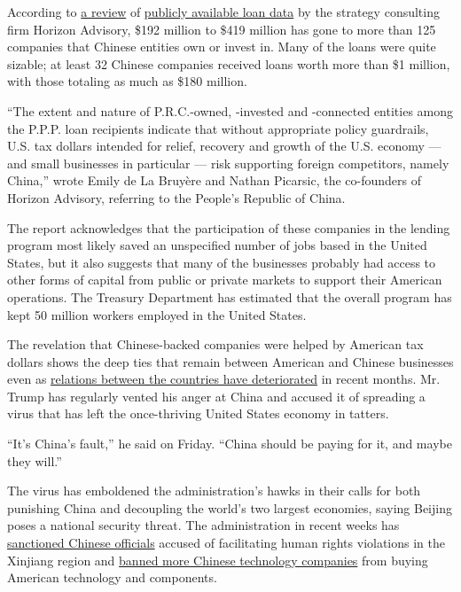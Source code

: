 According to \href{https://www.horizonadvisory.org/paycheckprotection}{a
review} of
\href{https://www.nytimes.com/2020/07/06/us/ppp-small-business-loans.html}{publicly
available loan data} by the strategy consulting firm Horizon Advisory,
\$192 million to \$419 million has gone to more than 125 companies that
Chinese entities own or invest in. Many of the loans were quite sizable;
at least 32 Chinese companies received loans worth more than \$1
million, with those totaling as much as \$180 million.

``The extent and nature of P.R.C.-owned, -invested and -connected
entities among the P.P.P. loan recipients indicate that without
appropriate policy guardrails, U.S. tax dollars intended for relief,
recovery and growth of the U.S. economy --- and small businesses in
particular --- risk supporting foreign competitors, namely China,''
wrote Emily de La Bruyère and Nathan Picarsic, the co-founders of
Horizon Advisory, referring to the People's Republic of China.

The report acknowledges that the participation of these companies in the
lending program most likely saved an unspecified number of jobs based in
the United States, but it also suggests that many of the businesses
probably had access to other forms of capital from public or private
markets to support their American operations. The Treasury Department
has estimated that the overall program has kept 50 million workers
employed in the United States.

The revelation that Chinese-backed companies were helped by American tax
dollars shows the deep ties that remain between American and Chinese
businesses even as
\href{https://www.nytimes.com/2020/07/25/world/asia/us-china-trump-xi.html}{relations
between the countries have deteriorated} in recent months. Mr. Trump has
regularly vented his anger at China and accused it of spreading a virus
that has left the once-thriving United States economy in tatters.

``It's China's fault,'' he said on Friday. ``China should be paying for
it, and maybe they will.''

The virus has emboldened the administration's hawks in their calls for
both punishing China and decoupling the world's two largest economies,
saying Beijing poses a national security threat. The administration in
recent weeks has
\href{https://www.nytimes.com/2020/07/31/us/politics/sanctions-china-xinjiang-uighurs.html}{sanctioned
Chinese officials} accused of facilitating human rights violations in
the Xinjiang region and
\href{https://www.nytimes.com/2020/07/20/business/economy/china-sanctions-uighurs-labor.html}{banned
more Chinese technology companies} from buying American technology and
components.


